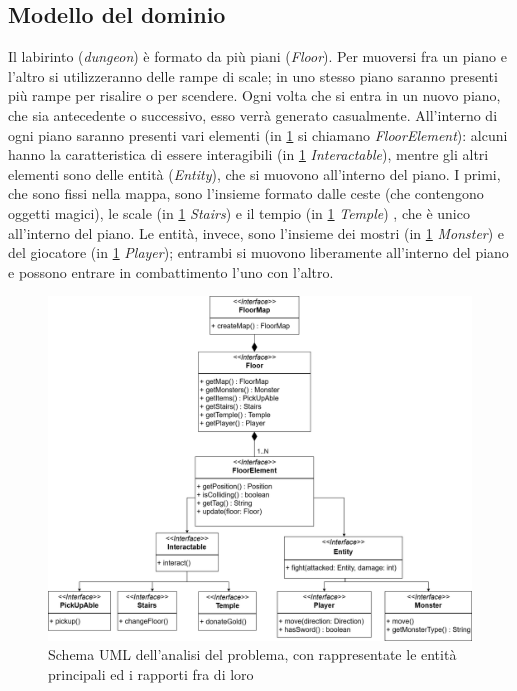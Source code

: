 \documentclass{report}
\begin{document}
\newpage
\subsection{Modello del dominio}

Il labirinto (\textit{dungeon}) è formato da più piani (\textit{Floor}). 
%
Per muoversi fra un piano e l’altro si utilizzeranno delle rampe di scale; in uno stesso piano saranno presenti più rampe per risalire o per scendere. 
%
Ogni volta che si entra in un nuovo piano, che sia antecedente o successivo, esso verrà generato casualmente. 
%
All’interno di ogni piano saranno presenti vari elementi (in \ref{img:DiagrammaUMLAnalisi} si chiamano \textit{FloorElement}): alcuni hanno la caratteristica di essere interagibili (in \ref{img:DiagrammaUMLAnalisi} \textit{Interactable}), mentre gli altri elementi sono delle entità (\textit{Entity}), che si muovono all’interno del piano. 
%
I primi, che sono fissi nella mappa, sono l’insieme formato dalle ceste (che contengono oggetti magici), le scale (in \ref{img:DiagrammaUMLAnalisi} \textit{Stairs}) e il tempio (in \ref{img:DiagrammaUMLAnalisi} \textit{Temple}) , che è unico all’interno del piano. 
%
Le entità, invece, sono l’insieme dei mostri (in \ref{img:DiagrammaUMLAnalisi} \textit{Monster}) e del giocatore (in \ref{img:DiagrammaUMLAnalisi} \textit{Player}); entrambi si muovono liberamente all’interno del piano e possono entrare in combattimento l’uno con l’altro. 

\begin{figure}[H]
    \centering
    \includegraphics[width=12cm]{DiagrammaAnalisi.drawio.png}
    \caption{Schema UML dell'analisi del problema, con rappresentate le entità principali ed i rapporti fra di loro}
    \label{img:DiagrammaUMLAnalisi}
\end{figure}
\end{document}
